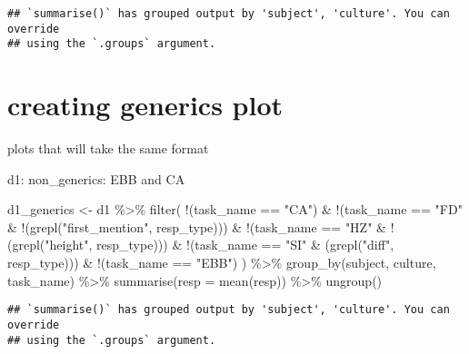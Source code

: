 \documentclass[
]{article}
\newenvironment{Shaded}{\begin{snugshade}}{\end{snugshade}}
\newcommand{\AttributeTok}[1]{\textcolor[rgb]{0.77,0.63,0.00}{#1}}
\newcommand{\FunctionTok}[1]{\textcolor[rgb]{0.00,0.00,0.00}{#1}}
\newcommand{\NormalTok}[1]{#1}
\newcommand{\OtherTok}[1]{\textcolor[rgb]{0.56,0.35,0.01}{#1}}
\newcommand{\SpecialCharTok}[1]{\textcolor[rgb]{0.00,0.00,0.00}{#1}}
\newcommand{\StringTok}[1]{\textcolor[rgb]{0.31,0.60,0.02}{#1}}
\begin{document}
\begin{verbatim}
## `summarise()` has grouped output by 'subject', 'culture'. You can override
## using the `.groups` argument.
\end{verbatim}

\hypertarget{creating-generics-plot}{%
\section{creating generics plot}\label{creating-generics-plot}}

plots that will take the same format

d1: non\_generics: EBB and CA

\begin{Shaded}
\begin{Highlighting}[]
\NormalTok{d1\_generics }\OtherTok{\textless{}{-}}\NormalTok{ d1 }\SpecialCharTok{\%\textgreater{}\%} 
  \FunctionTok{filter}\NormalTok{(}
    \SpecialCharTok{!}\NormalTok{(task\_name }\SpecialCharTok{==} \StringTok{"CA"}\NormalTok{) }\SpecialCharTok{\&} 
    \SpecialCharTok{!}\NormalTok{(task\_name }\SpecialCharTok{==} \StringTok{"FD"} \SpecialCharTok{\&} \SpecialCharTok{!}\NormalTok{(}\FunctionTok{grepl}\NormalTok{(}\StringTok{"first\_mention"}\NormalTok{, resp\_type))) }\SpecialCharTok{\&} 
    \SpecialCharTok{!}\NormalTok{(task\_name }\SpecialCharTok{==} \StringTok{"HZ"} \SpecialCharTok{\&} \SpecialCharTok{!}\NormalTok{(}\FunctionTok{grepl}\NormalTok{(}\StringTok{"height"}\NormalTok{, resp\_type))) }\SpecialCharTok{\&} 
    \SpecialCharTok{!}\NormalTok{(task\_name }\SpecialCharTok{==} \StringTok{"SI"} \SpecialCharTok{\&}\NormalTok{ (}\FunctionTok{grepl}\NormalTok{(}\StringTok{"diff"}\NormalTok{, resp\_type))) }\SpecialCharTok{\&} 
    \SpecialCharTok{!}\NormalTok{(task\_name }\SpecialCharTok{==} \StringTok{"EBB"}\NormalTok{)}
\NormalTok{  ) }\SpecialCharTok{\%\textgreater{}\%} 
  \FunctionTok{group\_by}\NormalTok{(subject, culture, task\_name) }\SpecialCharTok{\%\textgreater{}\%} 
  \FunctionTok{summarise}\NormalTok{(}\AttributeTok{resp =} \FunctionTok{mean}\NormalTok{(resp)) }\SpecialCharTok{\%\textgreater{}\%} 
  \FunctionTok{ungroup}\NormalTok{()}
\end{Highlighting}
\end{Shaded}

\begin{verbatim}
## `summarise()` has grouped output by 'subject', 'culture'. You can override
## using the `.groups` argument.
\end{verbatim}
\end{document}
